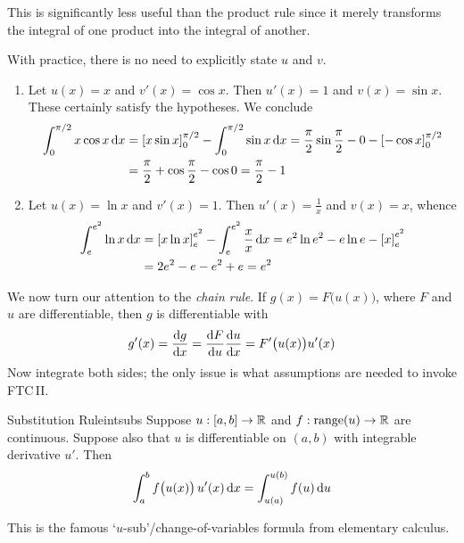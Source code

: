 This is significantly less useful than the product rule since it merely transforms the integral of one product into the integral of another.


\goodbreak


\begin{examples}{}{}
	With practice, there is no need to explicitly state $u$ and $v$.
	\begin{enumerate}
	  \item Let $u(x)=x$ and $v'(x)=\cos x$. Then $u'(x)=1$ and $v(x)=\sin x$. These certainly satisfy the hypotheses. We conclude
		\begin{align*}
			\int_0^{\pi/2} x\cos x\,\dx &=\left[x\sin x\right]_0^{\pi/2} -\int_0^{\pi/2}\sin x\,\dx =\frac\pi 2\sin\frac{\pi}2-0-\left[-\cos x\right]_0^{\pi/2}\\
			&=\frac\pi 2+\cos\frac\pi 2-\cos 0=\frac\pi 2-1
		\end{align*}
		\item Let $u(x)=\ln x$ and $v'(x)=1$. Then $u'(x)=\frac 1x$ and $v(x)=x$, whence
		\begin{align*}
			\int_e^{e^2} \ln x\,\dx &=\left[x\ln x\right]_e^{e^2} -\int_e^{e^2}\frac xx\,\dx =e^2\ln e^2-e\ln e-\left[x\right]_e^{e^2}\\
			&=2e^2-e-e^2+e =e^2
		\end{align*}
	\end{enumerate}
\end{examples}


We now turn our attention to the \emph{chain rule}. If $g(x)=F\bigl(u(x)\bigr)$, where $F$ and $u$ are differentiable, then $g$ is differentiable with
\[
	g'(x) =\diff[g]{x} =\diff[F]{u}\diff[u]{x} =F'\bigl(u(x)\bigr) u'(x)
\]
Now integrate both sides; the only issue is what assumptions are needed to invoke FTC\,II.

\begin{thm}{Substitution Rule}{intsubs}
	Suppose $u:[a,b]\to\R$ and $f:\range(u)\to\R$ are continuous. Suppose also that $u$ is differentiable on $(a,b)$ with integrable derivative $u'$. Then
	\[
		\int_a^bf\bigl(u(x)\bigr)\,u'(x)\,\dx=\int_{u(a)}^{u(b)}f(u)\,\du
	\]
\end{thm}

This is the famous `$u$-sub'/change-of-variables formula from elementary calculus.


